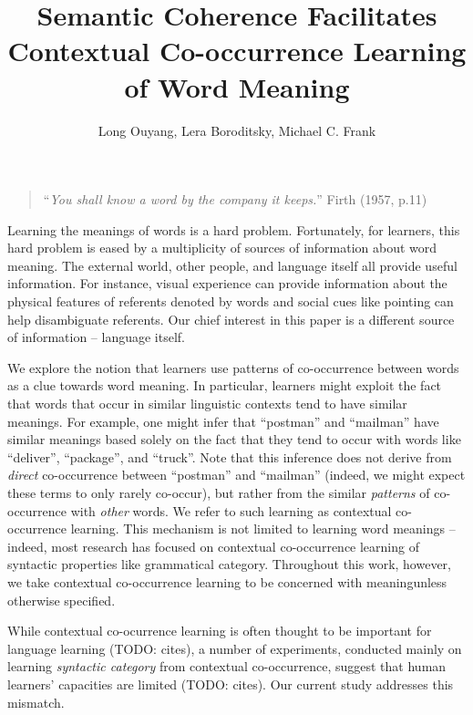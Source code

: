 \documentclass[man,floatsintext]{apa6}
\title{Semantic Coherence Facilitates Contextual Co-occurrence Learning of Word Meaning}
\author{Long Ouyang, Lera Boroditsky, Michael C. Frank}
\affiliation{Stanford University}
\begin{document}
\maketitle

\begin{quote}
``\emph{You shall know a word by the company it keeps.}'' Firth (1957, p.11)
\end{quote}


Learning the meanings of words is a hard problem. Fortunately, for learners, this hard problem is eased by a multiplicity of sources of information about word meaning. The external world, other people, and language itself all provide useful information. For instance, visual experience can provide information about the physical features of referents denoted by words and social cues like pointing can help disambiguate referents. Our chief interest in this paper is a different source of information -- language itself.

We explore the notion that learners use patterns of co-occurrence between words as a clue towards word meaning. In particular, learners might exploit the fact that words that occur in similar linguistic contexts tend to have similar meanings. For example, one might infer that ``postman'' and ``mailman'' have similar meanings based solely on the fact that they tend to occur with words like ``deliver'', ``package'', and ``truck''. Note that this inference does not derive from \emph{direct} co-occurrence between ``postman'' and ``mailman'' (indeed, we might expect these terms to only rarely co-occur), but rather from the similar \emph{patterns} of co-occurrence with \emph{other} words. We refer to such learning as contextual co-occurrence learning. This mechanism is not limited to learning word meanings -- indeed, most research has focused on contextual co-occurrence learning of syntactic properties like grammatical category. Throughout this work, however, we take contextual co-occurrence learning to be concerned with meaningunless otherwise specified.

While contextual co-ocurrence learning is often thought to be important for language learning (TODO: cites), a number of experiments, conducted mainly on learning \emph{syntactic category} from contextual co-occurrence, suggest that human learners' capacities are limited (TODO: cites). Our current study addresses this mismatch.
 
\end{document}
